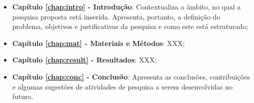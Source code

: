 \begin{itemize}

  \item \textbf{Capítulo \ref{chap:intro} - Introdução}: Contextualiza o âmbito, no qual a pesquisa proposta está inserida. Apresenta, portanto, a definição do problema, objetivos e justificativas da pesquisa e como este \thetypeworkthree está estruturado;
  \item \textbf{Capítulo \ref{chap:mat} - Materiais e Métodos}: XXX;
  \item \textbf{Capítulo \ref{chap:result} - Resultados}: XXX;
  \item \textbf{Capítulo \ref{chap:conc} - Conclusão}: Apresenta as conclusões, contribuições e algumas sugestões de atividades de pesquisa a serem desenvolvidas no futuro.

\end{itemize}